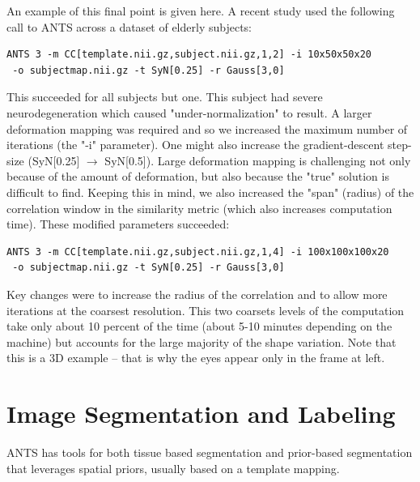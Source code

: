 \documentclass{InsightArticle}
\begin{document}
An example of this final point is given here.   
A recent study used the following call to ANTS across a dataset of elderly subjects:
\begin{verbatim}
ANTS 3 -m CC[template.nii.gz,subject.nii.gz,1,2] -i 10x50x50x20
 -o subjectmap.nii.gz -t SyN[0.25] -r Gauss[3,0]
\end{verbatim}
This succeeded for all subjects but one.  This subject had severe neurodegeneration which caused "under-normalization" to result.  A larger deformation mapping was required and so we increased the maximum number of iterations (the "-i" parameter).  One might also increase the gradient-descent step-size (SyN[0.25] $\rightarrow$ SyN[0.5]).   Large deformation mapping is challenging not only because of the amount of deformation, but also because the "true" solution is difficult to find.  Keeping this in mind, we also increased the "span" (radius) of the correlation window in the similarity metric (which also increases computation time). These modified parameters succeeded: 
\begin{verbatim}
ANTS 3 -m CC[template.nii.gz,subject.nii.gz,1,4] -i 100x100x100x20
 -o subjectmap.nii.gz -t SyN[0.25] -r Gauss[3,0] 
\end{verbatim}
Key changes were to increase the radius of the correlation and to
allow more iterations at the coarsest resolution.  
This two coarsets levels of the computation take only about
10 percent of the time (about 5-10 minutes depending on the machine)
but accounts for the large majority of the shape variation.  Note that
this is a 3D example -- that is why the eyes appear only in the frame
at left. 

\newpage
\section{Image Segmentation and Labeling}
ANTS has tools for both tissue based segmentation and prior-based segmentation that 
leverages spatial priors, usually based on a template mapping.  
\end{document}
